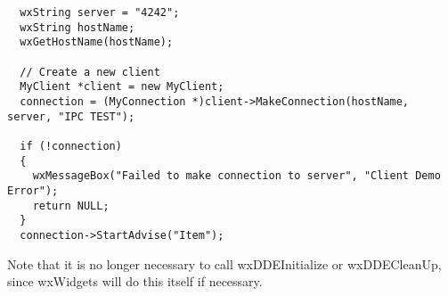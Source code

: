 \begin{verbatim}
  wxString server = "4242";
  wxString hostName;
  wxGetHostName(hostName);

  // Create a new client
  MyClient *client = new MyClient;
  connection = (MyConnection *)client->MakeConnection(hostName, server, "IPC TEST");

  if (!connection)
  {
    wxMessageBox("Failed to make connection to server", "Client Demo Error");
    return NULL;
  }
  connection->StartAdvise("Item");
\end{verbatim}

Note that it is no longer necessary to call wxDDEInitialize or wxDDECleanUp, since
wxWidgets will do this itself if necessary.

